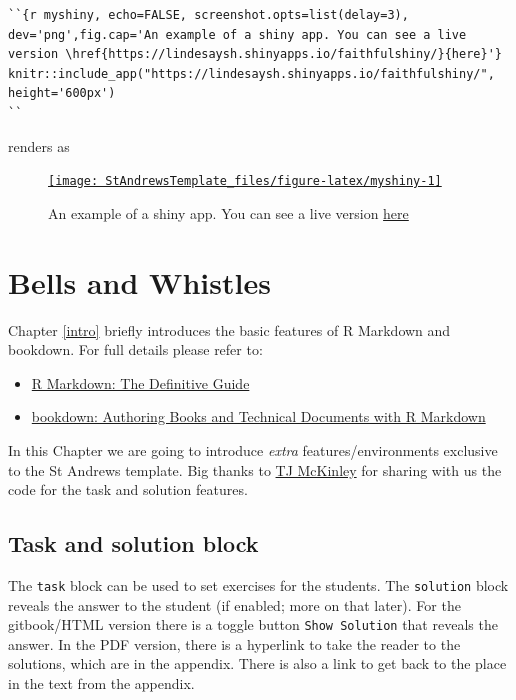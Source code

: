\documentclass[
  oneside]{krantz}
\providecommand{\tightlist}{%
  \setlength{\itemsep}{0pt}\setlength{\parskip}{0pt}}
\theoremstyle{definition}
\theoremstyle{definition}
\theoremstyle{definition}
\theoremstyle{remark}
\begin{document}
\begin{verbatim}
``{r myshiny, echo=FALSE, screenshot.opts=list(delay=3), dev='png',fig.cap='An example of a shiny app. You can see a live version \href{https://lindesaysh.shinyapps.io/faithfulshiny/}{here}'}
knitr::include_app("https://lindesaysh.shinyapps.io/faithfulshiny/", height='600px')
``
\end{verbatim}

renders as



\begin{figure}

{\centering \href{https://lindesaysh.shinyapps.io/faithfulshiny/}{\texttt{[image: StAndrewsTemplate\_files/figure-latex/myshiny-1]} }

}

\caption{An example of a shiny app. You can see a live version \href{https://lindesaysh.shinyapps.io/faithfulshiny/}{here}}\label{fig:myshiny}
\end{figure}

\hypertarget{bellsandwhistles}{%
\chapter{Bells and Whistles}\label{bellsandwhistles}}

Chapter \ref{intro} briefly introduces the basic features of R Markdown and bookdown. For full details please refer to:

\begin{itemize}
\tightlist
\item
  \href{https://bookdown.org/yihui/rmarkdown/}{R Markdown: The Definitive Guide}
\item
  \href{https://bookdown.org/yihui/bookdown/}{bookdown: Authoring Books and Technical Documents with R Markdown}
\end{itemize}

In this Chapter we are going to introduce \emph{extra} features/environments exclusive to the St Andrews template. Big thanks to \href{https://github.com/tjmckinley/RtutorialSkeleton}{TJ McKinley} for sharing with us the code for the task and solution features.

\hypertarget{task-and-solution-block}{%
\section{Task and solution block}\label{task-and-solution-block}}

The \texttt{task} block can be used to set exercises for the students. The \texttt{solution} block reveals the answer to the student (if enabled; more on that later). For the gitbook/HTML version
there is a toggle button \texttt{Show\ Solution} that reveals the answer. In the PDF version, there is a hyperlink to take the reader to the solutions, which are in the appendix. There is also a link to get back to the place in the text from the appendix.
\end{document}
